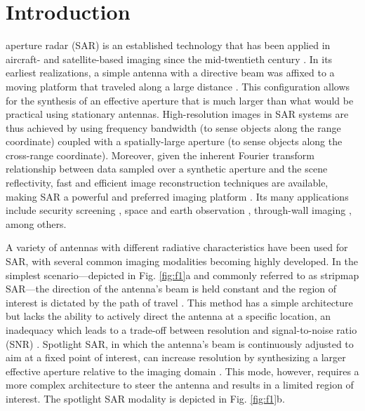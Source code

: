\documentclass[journal]{IEEEtran}
\begin{document}
\section{Introduction}
\label{sec:sec1}
 aperture radar (SAR) is an established technology that has been applied in aircraft- and satellite-based imaging since the mid-twentieth century \cite{curlander1991SAR,soumekh1999SAR,brown1969SARintroduction}. In its earliest realizations, a simple antenna with a directive beam was affixed to a moving platform that traveled along a large distance \cite{soumekh1999SAR}. This configuration allows for the synthesis of an effective aperture that is much larger than what would be practical using stationary antennas. High-resolution images in SAR systems are thus achieved by using frequency bandwidth (to sense objects along the range coordinate) coupled with a spatially-large aperture (to sense objects along the cross-range coordinate). Moreover, given the inherent Fourier transform relationship between data sampled over a synthetic aperture and the scene reflectivity, fast and efficient image reconstruction techniques are available, making SAR a powerful and preferred imaging platform \cite{Pulido-Mancera2016c,soumekh1994fourierarray,yarovoySparseSAR,zhuge2012three}. Its many applications include security screening \cite{sheen2001threatimaging,alvarez2015_3dCS,gonzalez2014sparse,ahmed2011Imaging,ahmed2012Imaging}, space and earth observation \cite{sarabandi1992EarthImage,treuhaft1996vegetation}, through-wall imaging \cite{dehmollaian2008throughwall,huang2010throughwall}, among others.

A variety of antennas with different radiative characteristics have been used for SAR, with several common imaging modalities becoming highly developed. In the simplest scenario---depicted in Fig. \ref{fig:f1}a and commonly referred to as stripmap SAR---the direction of the antenna's beam is held constant and the region of interest is dictated by the path of travel \cite{soumekh1999SAR}. This method has a simple architecture but lacks the ability to actively direct the antenna at a specific location, an inadequacy which leads to a trade-off between resolution and signal-to-noise ratio (SNR) \cite{soumekh1999SAR}. Spotlight SAR, in which the antenna's beam is continuously adjusted to aim at a fixed point of interest, can increase resolution by synthesizing a larger effective aperture relative to the imaging domain \cite{jakowatz2012spotlight}. This mode, however, requires a more complex architecture to steer the antenna and results in a limited region of interest.  The spotlight SAR modality is depicted in Fig. \ref{fig:f1}b.
\end{document}

